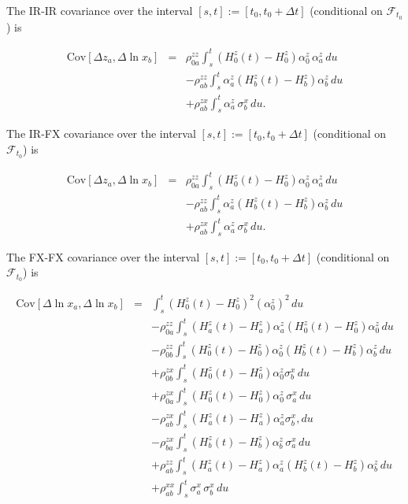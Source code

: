 \documentclass[12pt, a4paper]{article}
\begin{document}
\begin{appendix}
The IR-IR covariance over the interval $[s,t] := [t_0, t_0+\Delta t]$ (conditional on $\mathcal{F}_{t_0}$) is

\begin{eqnarray*}
      \mathrm{Cov} [\Delta z_a, \Delta \ln x_b] &=& \rho^{zz}_{0a}\int_s^t \left(H^z_0(t)-H^z_0\right)
  \alpha^z_0\,\alpha^z_a\,du \nonumber\\
      &&- \rho^{zz}_{ab}\int_s^t \alpha^z_a \left(H^z_b(t)-H^z_b\right) \alpha^z_b \,du \nonumber\\
      &&+\rho^{zx}_{ab}\int_s^t \alpha^z_a \, \sigma^x_b \,du.
\end{eqnarray*}

The IR-FX covariance over the interval $[s,t] := [t_0, t_0+\Delta t]$ (conditional on $\mathcal{F}_{t_0}$) is

\begin{eqnarray*}
      \mathrm{Cov} [\Delta z_a, \Delta \ln x_b] &=& \rho^{zz}_{0a}\int_s^t \left(H^z_0(t)-H^z_0\right)
  \alpha^z_0\,\alpha^z_a\,du \nonumber\\
      &&- \rho^{zz}_{ab}\int_s^t \alpha^z_a \left(H^z_b(t)-H^z_b\right) \alpha^z_b \,du \nonumber\\
      &&+\rho^{zx}_{ab}\int_s^t \alpha^z_a \, \sigma^x_b \,du.
\end{eqnarray*}

The FX-FX covariance over the interval $[s,t] := [t_0, t_0+\Delta t]$ (conditional on $\mathcal{F}_{t_0}$) is

\begin{eqnarray*}
      \mathrm{Cov}[\Delta \ln x_a, \Delta \ln x_b] &=&
      \int_s^t \left(H^z_0(t)-H^z_0\right)^2 (\alpha_0^z)^2\,du \nonumber\\
      && -\rho^{zz}_{0a} \int_s^t \left(H^z_a(t)-H^z_a\right) \alpha_a^z\left(H^z_0(t)-H^z_0\right) \alpha_0^z\,du
  \nonumber\\
      &&- \rho^{zz}_{0b}\int_s^t \left(H^z_0(t)-H^z_0\right)\alpha_0^z \left(H^z_b(t)-H^z_b\right)\alpha_b^z\,du
  \nonumber\\
      &&+ \rho^{zx}_{0b}\int_s^t \left(H^z_0(t)-H^z_0\right)\alpha_0^z \sigma^x_b\,du \nonumber\\
      &&+ \rho^{zx}_{0a}\int_s^t \left(H^z_0(t)-H^z_0\right)\alpha_0^z\,\sigma^x_a\,du \nonumber\\
      &&- \rho^{zx}_{ab}\int_s^t \left(H^z_a(t)-H^z_a\right)\alpha_a^z \sigma^x_b,du\nonumber\\
      &&- \rho^{zx}_{ba}\int_s^t \left(H^z_b(t)-H^z_b\right)\alpha_b^z\,\sigma^x_a\, du \nonumber\\
      &&+ \rho^{zz}_{ab}\int_s^t \left(H^z_a(t)-H^z_a\right)\alpha_a^z \left(H^z_b(t)-H^z_b\right)\alpha_b^z\,du
  \nonumber\\
      &&+ \rho^{xx}_{ab}\int_s^t\sigma^x_a\,\sigma^x_b \,du
\end{eqnarray*}


\end{appendix}
\end{document}
